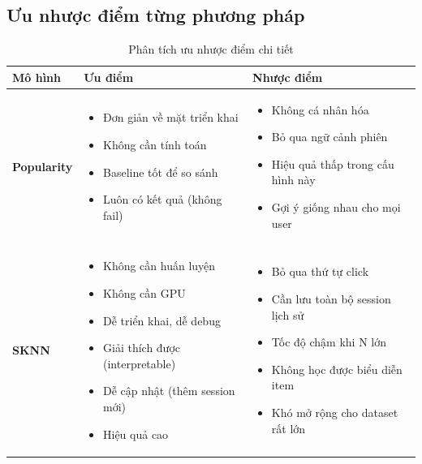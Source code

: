 \documentclass[12pt, a4paper]{article}
\begin{document}
\subsection{Ưu nhược điểm từng phương pháp}

\begin{table}[H]
\centering
\caption{Phân tích ưu nhược điểm chi tiết}
\label{tab:pros_cons}
\begin{tabular}{L{2.7cm}L{5.4cm}L{5.4cm}}
\toprule
\textbf{Mô hình} & \textbf{Ưu điểm} & \textbf{Nhược điểm} \\
\midrule
\textbf{Popularity} & 
\begin{itemize}[leftmargin=0.3cm, topsep=0pt]
    \item Đơn giản về mặt triển khai
    \item Không cần tính toán
    \item Baseline tốt để so sánh
    \item Luôn có kết quả (không fail)
\end{itemize} &
\begin{itemize}[leftmargin=0.3cm, topsep=0pt]
    \item Không cá nhân hóa
    \item Bỏ qua ngữ cảnh phiên
    \item Hiệu quả thấp trong cấu hình này
    \item Gợi ý giống nhau cho mọi user
\end{itemize} \\
\midrule
\textbf{SKNN} &
\begin{itemize}[leftmargin=0.3cm, topsep=0pt]
    \item Không cần huấn luyện
    \item Không cần GPU
    \item Dễ triển khai, dễ debug
    \item Giải thích được (interpretable)
    \item Dễ cập nhật (thêm session mới)
    \item Hiệu quả cao
\end{itemize} &
\begin{itemize}[leftmargin=0.3cm, topsep=0pt]
    \item Bỏ qua thứ tự click
    \item Cần lưu toàn bộ session lịch sử
    \item Tốc độ chậm khi N lớn
    \item Không học được biểu diễn item
    \item Khó mở rộng cho dataset rất lớn

\end{itemize}
\end{tabular}
\end{table}
\end{document}
